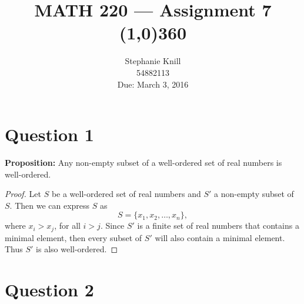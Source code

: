 \documentclass[11pt, oneside]{article}   	%
\begin{document}
\title{MATH 220 --- Assignment 7 \\
\line(1,0){360} \\              %
}
\author{
Stephanie Knill \\
54882113 \\
Due: March 3, 2016}

\date{}                   %
\maketitle




\section*{Question 1}

\textbf{Proposition:} Any non-empty subset of a well-ordered set of real numbers is well-ordered.

\begin{proof}
Let $S$ be a well-ordered set of real numbers and $S'$ a non-empty subset of $S$. Then we can express $S$ as
$$S=\{x_1, x_2, \ldots, x_n\},$$
where $x_i > x_j$, for all $i>j$.
Since $S'$ is a finite set of real numbers that contains a minimal element, then every subset of $S'$ will also contain a minimal element. Thus $S'$ is also well-ordered.
\end{proof}

\section*{Question 2}
\end{document}
